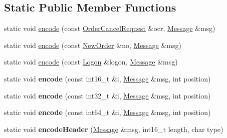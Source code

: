 \subsection*{Static Public Member Functions}
\begin{DoxyCompactItemize}
\item 
static void \hyperlink{classMetal_1_1LSE_1_1MilleniumCodec_a0db727988a60b489983d3650c2dbb5fd}{encode} (const \hyperlink{classMetal_1_1LSE_1_1OrderCancelRequest}{Order\+Cancel\+Request} \&ocr, \hyperlink{classMetal_1_1Message}{Message} \&msg)
\item 
static void \hyperlink{classMetal_1_1LSE_1_1MilleniumCodec_a90425eb0c5be795fb6c35fc28a88aac1}{encode} (const \hyperlink{classMetal_1_1LSE_1_1NewOrder}{New\+Order} \&no, \hyperlink{classMetal_1_1Message}{Message} \&msg)
\item 
static void \hyperlink{classMetal_1_1LSE_1_1MilleniumCodec_a2ae620b4b54cf5dc12df16b976af4d34}{encode} (const \hyperlink{classMetal_1_1LSE_1_1Logon}{Logon} \&logon, \hyperlink{classMetal_1_1Message}{Message} \&msg)
\item 
\hypertarget{classMetal_1_1LSE_1_1MilleniumCodec_a343c554002e86b3376c160ef5aa434d1}{}static void {\bfseries encode} (const int16\+\_\+t \&i, \hyperlink{classMetal_1_1Message}{Message} \&msg, int position)\label{classMetal_1_1LSE_1_1MilleniumCodec_a343c554002e86b3376c160ef5aa434d1}

\item 
\hypertarget{classMetal_1_1LSE_1_1MilleniumCodec_a7c950822487d09fde69d98224aa95442}{}static void {\bfseries encode} (const int32\+\_\+t \&i, \hyperlink{classMetal_1_1Message}{Message} \&msg, int position)\label{classMetal_1_1LSE_1_1MilleniumCodec_a7c950822487d09fde69d98224aa95442}

\item 
\hypertarget{classMetal_1_1LSE_1_1MilleniumCodec_a1b1d14237dd5a548b59a0a3773fbee79}{}static void {\bfseries encode} (const int64\+\_\+t \&i, \hyperlink{classMetal_1_1Message}{Message} \&msg, int position)\label{classMetal_1_1LSE_1_1MilleniumCodec_a1b1d14237dd5a548b59a0a3773fbee79}

\item 
\hypertarget{classMetal_1_1LSE_1_1MilleniumCodec_a3b494f4615faf56115c32db1c3fcf4c5}{}static void {\bfseries encode\+Header} (\hyperlink{classMetal_1_1Message}{Message} \&msg, int16\+\_\+t length, char type)\label{classMetal_1_1LSE_1_1MilleniumCodec_a3b494f4615faf56115c32db1c3fcf4c5}

\end{DoxyCompactItemize}


